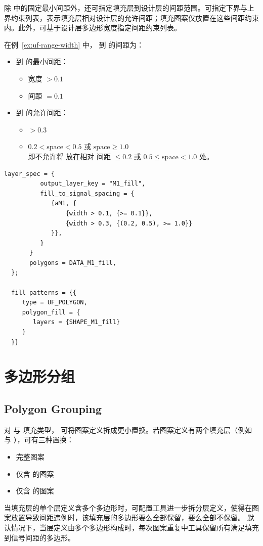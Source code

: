 除  中的固定最小间距外，还可指定填充层到设计层的间距范围。可指定下界与上界约束列表，表示填充层相对设计层的允许间距；填充图案仅放置在这些间距约束内。此外，可基于设计层多边形宽度指定间距约束列表。

在例~\ref{ex:uf-range-width} 中， 到  的间距为：
\begin{itemize}
  \item {} 到  的最小间距：
  \begin{itemize}
    \item {} 宽度 $> 0.1$
    \item 间距 $= 0.1$
  \end{itemize}
  \item {} 到  的允许间距：
  \begin{itemize}
    \item {} $> 0.3$
    \item $0.2 < \mathrm{space} < 0.5$ 或 $\mathrm{space} \geq 1.0$\\
    即不允许将  放在相对  间距 $\leq 0.2$ 或 $0.5 \leq \mathrm{space} < 1.0$ 处。
  \end{itemize}
\end{itemize}

\begin{lstlisting}[style=pxl,caption={范围与宽度相关间距示例},label={ex:uf-range-width}]
       layer_spec = {
          output_layer_key = "M1_fill",
          fill_to_signal_spacing = {
             {aM1, {
                 {width > 0.1, {>= 0.1}},
                 {width > 0.3, {(0.2, 0.5), >= 1.0}}
             }},
          }
       }
       polygons = DATA_M1_fill,
  };

  fill_patterns = {{
     type = UF_POLYGON,
     polygon_fill = {
        layers = {SHAPE_M1_fill}
     }
  }}
\end{lstlisting}

\section{多边形分组}
\subsection*{Polygon Grouping}

对  与  填充类型， 可将图案定义拆成更小置换。若图案定义有两个填充层（例如  与 ），可有三种置换：
\begin{itemize}
  \item 完整图案
  \item 仅含  的图案
  \item 仅含  的图案
\end{itemize}
当填充层的单个层定义含多个多边形时，可配置工具进一步拆分层定义，使得在图案放置导致间距违例时，该填充层的多边形要么全部保留，要么全部不保留。
默认情况下，当层定义由多个多边形构成时，每次图案重复中工具保留所有满足填充到信号间距的多边形。

